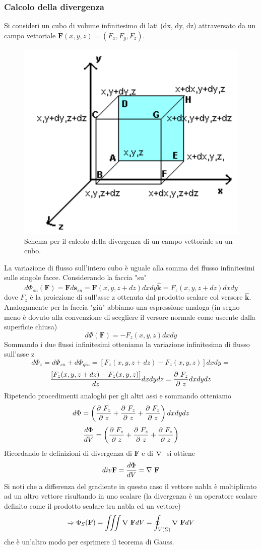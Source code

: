 \documentclass[
10pt, %
a4paper, %
oneside, %
headinclude,footinclude, %
BCOR5mm, %
]{scrartcl}
\begin{document}
\subsubsection{Calcolo della divergenza}
Si consideri un cubo di volume infinitesimo di lati (dx, dy, dz) attraversato da un campo vettoriale $\mathbf{F}(x,y,z) = (F_x, F_y, F_z)$.  
\begin{figure}[h!]
	\centering
	\includegraphics[width=0.6\linewidth]{../images/div_quadrato}
	\caption{Schema per il calcolo della divergenza di un campo vettoriale su un cubo.}
	\label{fig:divquadrato}
\end{figure}
\FloatBarrier
La variazione di flusso sull'intero cubo è uguale alla somma dei flusso infinitesimi sulle singole facce. Considerando la faccia "su"
\[d\Phi_{su}(\mathbf{F}) = \mathbf{F}d\mathbf{s}_{su} = \mathbf{F}(x, y, z + dz)dxdy\hat{\mathbf{k}}=F_z(x, y, z + dz)dxdy\]
dove \(F_z\) è la proiezione di sull'asse z ottenuta dal prodotto scalare col versore \(\hat{\mathbf{k}}\). 
Analogamente per la faccia "giù" abbiamo una espressione analoga (in segno meno è dovuto alla convenzione di scegliere il versore normale come uscente dalla superficie chiusa)
\[d\Phi(\mathbf{F}) = -F_z(x, y, z)dxdy\]
Sommando i due flussi infinitesimi otteniamo la variazione infinitesima di flusso sull'asse z
\[d\Phi_z= d\Phi_{su}+d\Phi_{giu}=\left[F_z(x,y,z+dz)-F_z(x,y,z)\right]dxdy=\]
\[\frac{\left[F_z(x,y,z+dz)-F_z(x,y,z)\right]}{dz}dxdydz=\frac{\partial\  F_z}{\partial\  z}dxdydz\]
Ripetendo procedimenti analoghi per gli altri assi e sommando otteniamo
\[d\Phi = \left(\frac{\partial\  F_z}{\partial\  z}+ \frac{\partial\  F_z}{\partial\  z}+ \frac{\partial\  F_z}{\partial\  z}\right)dxdydz \]
\[\frac{d\Phi}{dV} = \left(\frac{\partial\  F_z}{\partial\  z}+ \frac{\partial\  F_z}{\partial\  z}+ \frac{\partial\  F_z}{\partial\  z}\right)\]
Ricordando le definizioni di divergenza di $\mathbf{F}$ e di \(\mathbf{\nabla\ }\) si ottiene
\[div\mathbf{F} = \frac{d\Phi}{dV} = \mathbf{\nabla\ }\mathbf{F}\]
Si noti che a differenza del gradiente in questo caso il vettore nabla è moltiplicato ad un altro vettore risultando in uno scalare (la divergenza è un operatore scalare definito come il prodotto scalare tra nabla ed un vettore)
\[\Rightarrow \Phi_S(\mathbf{F}) = \iiint \mathbf{\nabla\ }\mathbf{F}dV = \oint_{V(\Sigma)} \mathbf{\nabla\ }\mathbf{F}dV\]
che è un'altro modo per esprimere il teorema di Gauss.
\end{document}
